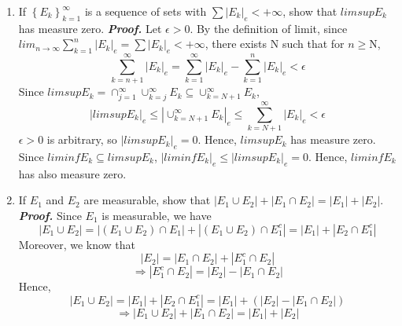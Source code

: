 \documentclass[a4paper,11pt]{article}
\begin{document}
\begin{enumerate}
\item If $\left\{ E_k \right\}_{k=1}^{\infty}$ is a sequence of sets with $\sum \left| E_k \right|_e < +\infty$, show that $lim sup E_k$ has measure zero.
\newline
\newline
\textit{\textbf {Proof.}}
\newline
Let $\epsilon > 0$.
By the definition of limit, since $lim_{n \to \infty} \sum_{k=1}^n \left| E_k \right|_e = \sum \left| E_k \right|_e < +\infty$, there exists $\mathrm{N}$ such that for $n \geq \mathrm{N}$,
$$\sum_{k = n+1}^{\infty} \left| E_k \right|_e = \sum_{k=1}^{\infty} \left| E_k \right|_e - \sum_{k=1}^{n} \left| E_k \right|_e < \epsilon$$
Since $lim sup E_k = \cap_{j=1}^{\infty} \cup_{k=j}^{\infty} E_k \subseteq \cup_{k=N+1}^{\infty} E_k$,
$$\left| lim sup E_k \right|_e \leq \left| \cup_{k=N+1}^{\infty} E_k\right|_e \leq \sum_{k=N+1}^{\infty} \left| E_k \right|_e < \epsilon$$
$\epsilon > 0$ is arbitrary, so $\left| lim sup E_k \right|_e = 0$. Hence, $lim sup E_k$ has measure zero.
\newline
\newline
Since $lim inf E_k \subseteq lim sup E_k$, $ \left| lim inf E_k \right|_e \leq \left| lim sup E_k \right|_e = 0$.
\newline Hence, $lim inf E_k$ has also measure zero.
\newline
\newline


\item If $E_1$ and $E_2$ are measurable, show that $\left| E_1 \cup E_2 \right| + \left| E_1 \cap E_2 \right| = \left| E_1 \right| +\left| E_2 \right|$.
\newline
\newline
\textit{\textbf {Proof.}}
\newline
Since $E_1$ is measurable, we have
$$|E_1 \cup E_2| = |(E_1 \cup E_2) \cap E_1| + |(E_1 \cup E_2) \cap E_1^c| = |E_1| + |E_2 \cap E_1^c|$$
Moreover, we know that
$$|E_2| = |E_1 \cap E_2| + |E_1^c \cap E_2|$$
$$\Rightarrow |E_1^c \cap E_2| = |E_2| - |E_1 \cap E_2|$$
Hence,
$$|E_1 \cup E_2| = |E_1| + |E_2 \cap E_1^c| = |E_1| + (|E_2| - |E_1 \cap E_2|)$$
$$\Rightarrow \left| E_1 \cup E_2 \right| + \left| E_1 \cap E_2 \right| = \left| E_1 \right| +\left| E_2 \right|$$
\newline
\newline



\end{enumerate}
\end{document}
